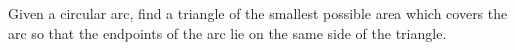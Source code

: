 Given a circular arc, find a triangle of the smallest possible area which covers the arc so that the endpoints of the arc lie on the same side of the triangle.